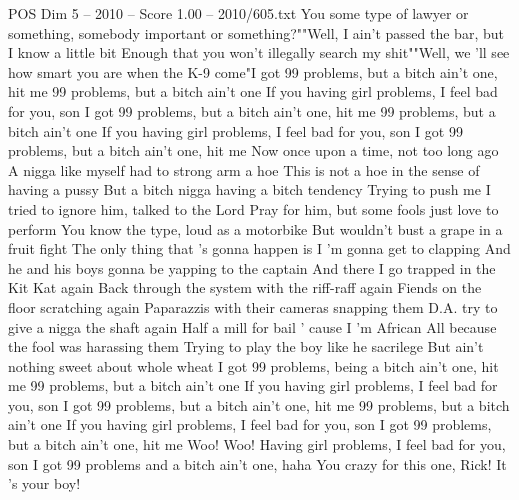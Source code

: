 \begin{textsample}{POS Dim 5 – 2010 – Score 1.00 – 2010/605.txt}
You some type of lawyer or something, somebody important or something?""Well, I ain't passed the bar, but I know a little bit Enough that you won't illegally search my shit""Well, we 'll see how smart you are when the K-9 come"I got 99 problems, but a bitch ain't one, hit me 99 problems, but a bitch ain't one If you having girl problems, I feel bad for you, son I got 99 problems, but a bitch ain't one, hit me 99 problems, but a bitch ain't one If you having girl problems, I feel bad for you, son I got 99 problems, but a bitch ain't one, hit me Now once upon a time, not too long ago A nigga like myself had to strong arm a hoe This is not a hoe in the sense of having a pussy But a bitch nigga having a bitch tendency Trying to push me I tried to ignore him, talked to the Lord Pray for him, but some fools just love to perform You know the type, loud as a motorbike But wouldn't bust a grape in a fruit fight The only thing that 's gonna happen is I 'm gonna get to clapping And he and his boys gonna be yapping to the captain And there I go trapped in the Kit Kat again Back through the system with the riff-raff again Fiends on the floor scratching again Paparazzis with their cameras snapping them D.A. try to give a nigga the shaft again Half a mill for bail ' cause I 'm African All because the fool was harassing them Trying to play the boy like he sacrilege But ain't nothing sweet about whole wheat I got 99 problems, being a bitch ain't one, hit me 99 problems, but a bitch ain't one If you having girl problems, I feel bad for you, son I got 99 problems, but a bitch ain't one, hit me 99 problems, but a bitch ain't one If you having girl problems, I feel bad for you, son I got 99 problems, but a bitch ain't one, hit me Woo!
Woo!
Having girl problems, I feel bad for you, son I got 99 problems and a bitch ain't one, haha You crazy for this one, Rick!
It 's your boy!

\end{textsample}
